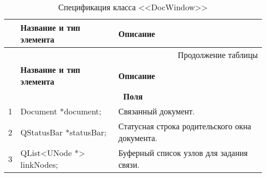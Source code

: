 \small
\singlespacing
\begin{longtable}[h]{|p{}|p{}|p{}|}
  \caption{Спецификация класса <<DocWindow>>}
	\\ \hline
	  \textbf{\No}                  &
	  \textbf{Название и тип элемента}  &
	  \textbf{Описание}
	\\ \hline
  \endfirsthead

  \multicolumn{3}{r}{Продолжение таблицы \thetable{}}
  \\ \hline
	  \textbf{\No}                  &
	  \textbf{Название и тип элемента}  &
	  \textbf{Описание}
	\\ \hline
  \endhead

  \multicolumn{3}{|c|}{\textbf{Поля}} \\
  \hline
  1 & Document *document; & Связанный документ. \\ \hline
  2 & QStatusBar *statusBar; & Статусная строка родительского окна документа. \\ \hline
  3 & QList<UNode *> linkNodes; & Буферный список узлов для задания связи. \\ \hline


\end{longtable}
